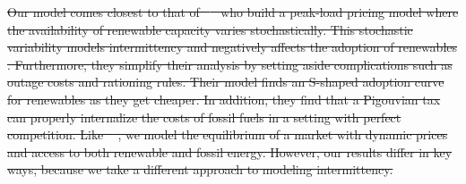 \documentclass[11pt,a4paper,leqno]{extarticle}
\providecommand{\DIFdel}[1]{{\protect\color{red}\sout{#1}}}                      %
\begin{document}
	\DIFdel{Our model comes closest to that of \mbox{%
			\citet{HH} }\hspace{0pt}%
		who build a peak-load pricing model where the availability of renewable capacity varies stochastically. This stochastic variability models intermittency and negatively affects the adoption of renewables . Furthermore, they simplify their analysis by setting aside complications such as  outage costs and rationing rules. Their model finds an S-shaped adoption curve for renewables as they get cheaper. In addition, they find that a Pigouvian tax can properly internalize the costs of fossil fuels in a setting with perfect competition. Like \mbox{%
			\citeauthor{HH}}\hspace{0pt}%
		, we model the  equilibrium of a market with dynamic prices and access to both renewable and fossil energy. However, our results differ in key ways, because we take a different approach to modeling intermittency. 
	}%
	
\end{document}
